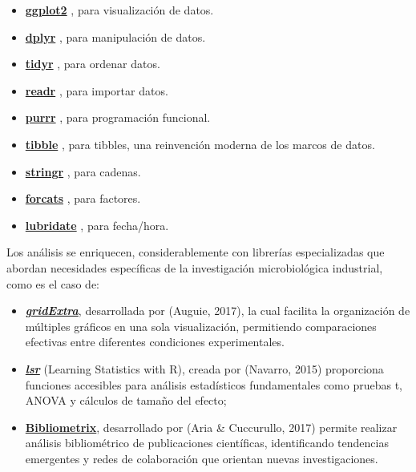\documentclass[
  spanish,
  letterpaper,
  DIV=11,
  numbers=noendperiod]{scrreprt}
\begin{document}
\begin{itemize}
\item
  \href{https://ggplot2.tidyverse.org/}{\textbf{ggplot2}} , para
  visualización de datos.
\item
  \href{https://dplyr.tidyverse.org/}{\textbf{dplyr}} , para
  manipulación de datos.
\item
  \href{https://tidyr.tidyverse.org/}{\textbf{tidyr}} , para ordenar
  datos.
\item
  \href{https://readr.tidyverse.org/}{\textbf{readr}} , para importar
  datos.
\item
  \href{https://purrr.tidyverse.org/}{\textbf{purrr}} , para
  programación funcional.
\item
  \href{https://tibble.tidyverse.org/}{\textbf{tibble}} , para tibbles,
  una reinvención moderna de los marcos de datos.
\item
  \href{https://github.com/tidyverse/stringr}{\textbf{stringr}} , para
  cadenas.
\item
  \href{https://github.com/tidyverse/forcats}{\textbf{forcats}} , para
  factores.
\item
  \href{https://github.com/tidyverse/lubridate}{\textbf{lubridate}} ,
  para fecha/hora.
\end{itemize}

Los análisis se enriquecen, considerablemente con librerías
especializadas que abordan necesidades específicas de la investigación
microbiológica industrial, como es el caso de:

\begin{itemize}
\item
  \href{https://cran.r-project.org/web/packages/gridExtra/index.html}{\textbf{\emph{gridExtra}}},
  desarrollada por (Auguie, 2017), la cual facilita la organización de
  múltiples gráficos en una sola visualización, permitiendo
  comparaciones efectivas entre diferentes condiciones experimentales.
\item
  \href{https://cran.r-project.org/web/packages/lsr/index.html}{\textbf{\emph{lsr}}}
  (Learning Statistics with R), creada por (Navarro, 2015) proporciona
  funciones accesibles para análisis estadísticos fundamentales como
  pruebas t, ANOVA y cálculos de tamaño del efecto;
\item
  \href{https://www.bibliometrix.org/home/}{\textbf{Bibliometrix}},
  desarrollado por (Aria \& Cuccurullo, 2017) permite realizar análisis
  bibliométrico de publicaciones científicas, identificando tendencias
  emergentes y redes de colaboración que orientan nuevas
  investigaciones.
\end{itemize}
\end{document}
